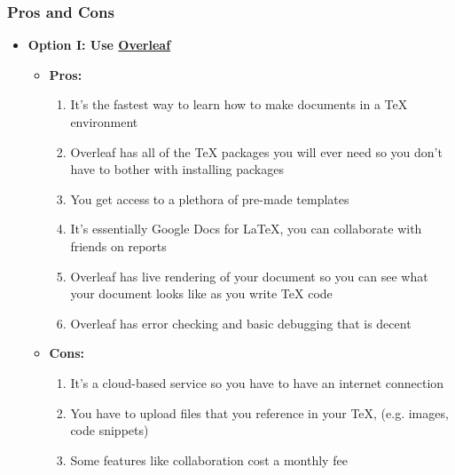 \documentclass{beamer}
\begin{document}
\begin{frame}
  \frametitle{Pros and Cons}

  \begin{itemize}
    \item \textbf{Option I: Use \href{overleaf.com}{Overleaf}}
      \begin{itemize}
        \item \textbf{Pros:}
          \begin{enumerate}
            \item It's the fastest way to learn how to make documents in a
              {\TeX} environment
            \item Overleaf has all of the {\TeX} packages you will ever need so
              you don't have to bother with installing packages
            \item You get access to a plethora of pre-made templates
            \item It's essentially Google Docs for {\LaTeX}, you can collaborate
              with friends on reports
            \item Overleaf has live rendering of your document so you can see
              what your document looks like as you write {\TeX} code
            \item Overleaf has error checking and basic debugging that is decent
          \end{enumerate}
        \item \textbf{Cons:}
          \begin{enumerate}
            \item It's a cloud-based service so you have to have an internet
              connection
            \item You have to upload files that you reference in your {\TeX},
              (e.g. images, code snippets)
            \item Some features like collaboration cost a monthly fee
          \end{enumerate}
      \end{itemize}
  \end{itemize}
\end{frame}
\end{document}
